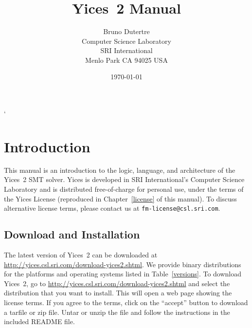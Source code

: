 \documentclass[11pt,twoside,fleqn,openright,titlepage]{cslreport}
\begin{document}
\begin{titlepage}
\date{\today}
\author{Bruno Dutertre\\
Computer Science Laboratory\\
SRI International\\
Menlo Park CA 94025 USA
}
\title{\bf Yices~2 Manual}
\end{titlepage}

\maketitle
`\cleardoublepageblank
\tableofcontents
\cleardoublepage
\setcounter{page}{0}


\chapter{Introduction}

This  manual   is  an  introduction   to  the  logic,   language,  and
architecture  of the  Yices~2 SMT  solver. Yices  is developed  in SRI
International's  Computer   Science  Laboratory  and   is  distributed
free-of-charge for personal use, under  the terms of the Yices License
(reproduced  in  Chapter~\ref{license} of  this  manual).  To  discuss
alternative     license     terms,     please    contact     us     at
\texttt{fm-license@csl.sri.com}.

\section{Download and Installation}

The    latest   version    of   Yices~2    can   be    downloaded   at
\url{http://yices.csl.sri.com/download-yices2.shtml}.     We   provide
binary distributions for the platforms and operating systems listed in
Table~\ref{versions}.      To     download     Yices~2,      go     to
\url{http://yices.csl.sri.com/download-yices2.shtml}  and  select  the
distribution  that you  want to  install. This  will open  a  web page
showing the  license terms. If  you agree to  the terms, click  on the
``accept'' button to  download a tarfile or zip  file.  Untar or unzip
the file and follow the instructions in the included README file.
\end{document}
